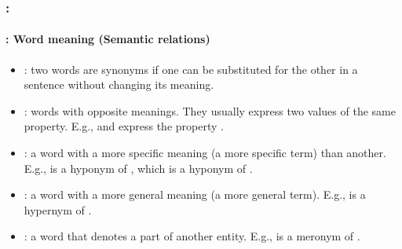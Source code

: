 \documentclass[xcolor=table]{beamer}
\begin{document}
\begin{frame}
	\frametitle{\insertshortsubtitle: \insertsection}
	\framesubtitle{\insertsubsection: Word meaning (Semantic relations)}
	
	\begin{itemize}
		\item {}: two words are synonyms if one can be substituted for the other in a sentence without changing its meaning.
		\item {}: words with opposite meanings. They usually express two values of the same property.
		E.g.,  and  express the property .
		
		\item {}: a word with a more specific meaning (a more specific term) than another.  
		E.g.,  is a hyponym of , which is a hyponym of .
		
		\item {}: a word with a more general meaning (a more general term).  
		E.g.,  is a hypernym of .
		
		\item {}: a word that denotes a part of another entity.  
		E.g.,  is a meronym of .
	\end{itemize}

\end{frame}
\end{document}
